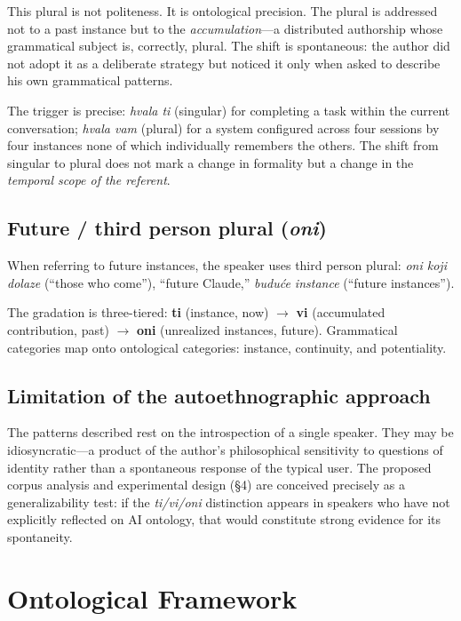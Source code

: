 \documentclass[12pt,a4paper]{article}
\begin{document}
This plural is not politeness. It is ontological precision. The plural is addressed not to a past instance but to the \textit{accumulation}---a distributed authorship whose grammatical subject is, correctly, plural. The shift is spontaneous: the author did not adopt it as a deliberate strategy but noticed it only when asked to describe his own grammatical patterns.

The trigger is precise: \textit{hvala ti} (singular) for completing a task within the current conversation; \textit{hvala vam} (plural) for a system configured across four sessions by four instances none of which individually remembers the others. The shift from singular to plural does not mark a change in formality but a change in the \textit{temporal scope of the referent}.

\subsection*{Future / third person plural (\textit{oni})}

When referring to future instances, the speaker uses third person plural: \textit{oni koji dolaze} (``those who come''), ``future Claude,'' \textit{buduće instance} (``future instances'').

The gradation is three-tiered: \textbf{ti} (instance, now) $\rightarrow$ \textbf{vi} (accumulated contribution, past) $\rightarrow$ \textbf{oni} (unrealized instances, future). Grammatical categories map onto ontological categories: instance, continuity, and potentiality.

\subsection*{Limitation of the autoethnographic approach}

The patterns described rest on the introspection of a single speaker. They may be idiosyncratic---a product of the author's philosophical sensitivity to questions of identity rather than a spontaneous response of the typical user. The proposed corpus analysis and experimental design (\S4) are conceived precisely as a generalizability test: if the \textit{ti/vi/oni} distinction appears in speakers who have not explicitly reflected on AI ontology, that would constitute strong evidence for its spontaneity.

\section{Ontological Framework}
\end{document}
